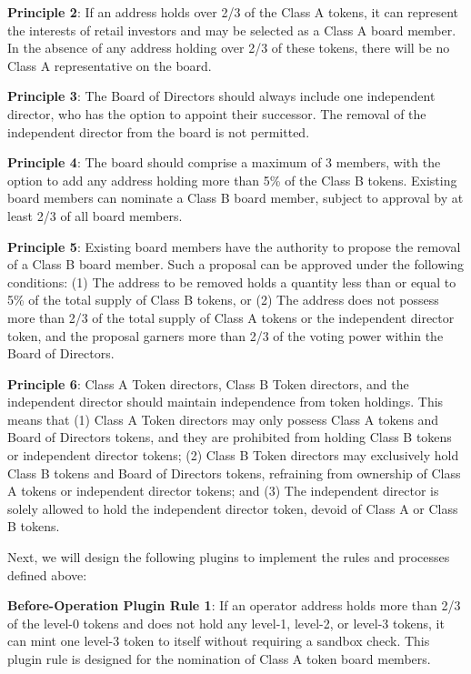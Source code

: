 \documentclass[main.tex]{subfiles}
\begin{document}
\textbf{Principle 2}: If an address holds over 2/3 of the Class A tokens, it can represent the interests of retail investors and may be selected as a Class A board member. In the absence of any address holding over 2/3 of these tokens, there will be no Class A representative on the board.

\textbf{Principle 3}: The Board of Directors should always include one independent director, who has the option to appoint their successor. The removal of the independent director from the board is not permitted.

\textbf{Principle 4}: The board should comprise a maximum of 3 members, with the option to add any address holding more than 5\% of the Class B tokens. Existing board members can nominate a Class B board member, subject to approval by at least 2/3 of all board members.

\textbf{Principle 5}: Existing board members have the authority to propose the removal of a Class B board member. Such a proposal can be approved under the following conditions: (1) The address to be removed holds a quantity less than or equal to 5\% of the total supply of Class B tokens, or (2) The address does not possess more than 2/3 of the total supply of Class A tokens or the independent director token, and the proposal garners more than 2/3 of the voting power within the Board of Directors.

\textbf{Principle 6}: Class A Token directors, Class B Token directors, and the independent director should maintain independence from token holdings. This means that (1) Class A Token directors may only possess Class A tokens and Board of Directors tokens, and they are prohibited from holding Class B tokens or independent director tokens; (2) Class B Token directors may exclusively hold Class B tokens and Board of Directors tokens, refraining from ownership of Class A tokens or independent director tokens; and (3) The independent director is solely allowed to hold the independent director token, devoid of Class A or Class B tokens.

Next, we will design the following plugins to implement the rules and processes defined above:

\textbf{Before-Operation Plugin Rule 1}: If an operator address holds more than 2/3 of the level-0 tokens and does not hold any level-1, level-2, or level-3 tokens, it can mint one level-3 token to itself without requiring a sandbox check. This plugin rule is designed for the nomination of Class A token board members.
\end{document}
